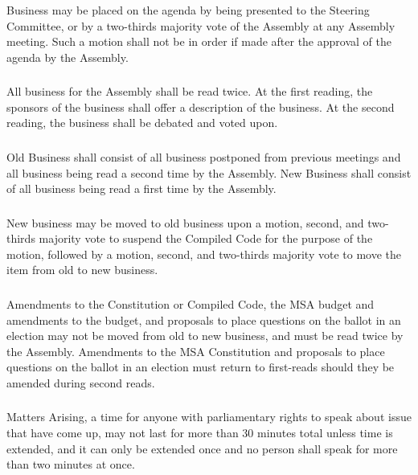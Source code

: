 \subsubsection{}
Business may be placed on the agenda by being presented to the Steering Committee, or by a two-thirds majority vote of the Assembly at any Assembly meeting.  Such a motion shall not be in order if made after the approval of the agenda by the Assembly.

\subsubsection{}
All business for the Assembly shall be read twice.  At the first reading, the sponsors of the business shall offer a description of the business.  At the second reading, the business shall be debated and voted upon.

\subsubsection{}
Old Business shall consist of all business postponed from previous meetings and all business being read a second time by the Assembly.  New Business shall consist of all business being read a first time by the Assembly. 

\subsubsection{}
New business may be moved to old business upon a motion, second, and two-thirds majority vote to suspend the Compiled Code for the purpose of the motion, followed by a motion, second, and two-thirds majority vote to move the item from old to new business.

\subsubsection{}
Amendments to the Constitution or Compiled Code, the MSA budget and amendments to the budget, and proposals to place questions on the ballot in an election may not be moved from old to new business, and must be read twice by the Assembly. Amendments to the MSA Constitution and proposals to place questions on the ballot in an election must return to first-reads should they be amended during second reads.

\subsubsection{}
Matters Arising, a time for anyone with parliamentary rights to speak about issue that have come up, may not last for more than 30 minutes total unless time is extended, and it can only be extended once and no person shall speak for more than two minutes at once.




